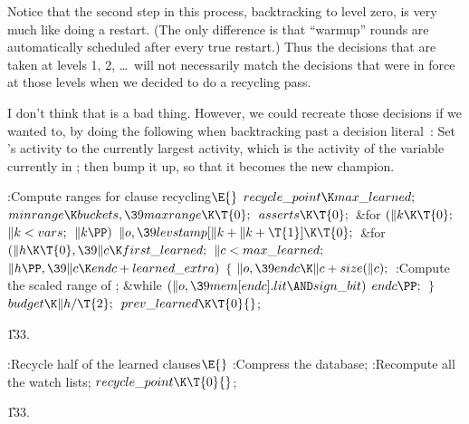 Notice that the second step in this process, backtracking to level zero,
is very much like doing a restart. (The only difference is that
``warmup'' rounds are automatically scheduled after every true restart.)
Thus the decisions that are taken at levels 1, 2, \dots\ will not necessarily
match the decisions that were in force at those levels when we decided to
do a recycling pass.

I don't think that is a bad thing. However, we could recreate those
decisions if we wanted to, by doing the following when backtracking
past a decision literal~: Set 's activity to the currently
largest
activity, which is the activity of the variable currently in ;
then bump it up, so that it becomes the new champion.

\Y\B\4:Compute ranges for clause recycling\X${}\E{}$\6
$\\{recycle\_point}\K\\{max\_learned};{}$\6
${}\\{minrange}\K\\{buckets},\39\\{maxrange}\K\T{0};{}$\6
${}\\{asserts}\K\T{0};{}$\6
\&{for} ${}(\|k\K\T{0};{}$ ${}\|k<\\{vars};{}$ ${}\|k\PP){}$\1\5
${}\|o,\39\\{levstamp}[\|k+\|k+\T{1}]\K\T{0};{}$\2\6
\&{for} ${}(\|h\K\T{0},\39\|c\K\\{first\_learned};{}$ ${}\|c<\\{max%
\_learned};{}$ ${}\|h\PP,\39\|c\K\\{endc}+\\{learned\_extra}){}$\5
${}\{{}$\1\6
${}\|o,\39\\{endc}\K\|c+\\{size}(\|c);{}$\6
:Compute the scaled range of \X;\6
\&{while} ${}(\|o,\39\\{mem}[\\{endc}].\\{lit}\AND\\{sign\_bit}){}$\1\5
${}\\{endc}\PP;{}$\2\6
\4${}\}{}$\2\6
${}\\{budget}\K\|h/\T{2};{}$\6
${}\\{prev\_learned}\K\T{0}{}$;\par
\U133.\fi

\B{}:Recycle half of the learned clauses\X${}\E{}$\6
:Compress the database\X;\6
:Recompute all the watch lists\X;\6
${}\\{recycle\_point}\K\T{0}{}$;\par
\U133.\fi

